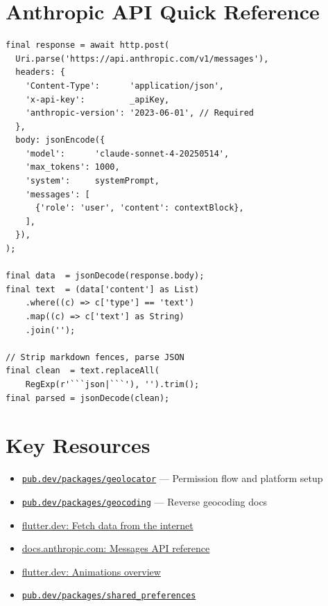 \documentclass[12pt, a4paper]{report}
\begin{document}
\section{Anthropic API Quick Reference}

\begin{tcolorbox}[cyanbox, title=Minimal Dart API Call]
\begin{lstlisting}[style=dartcode]
final response = await http.post(
  Uri.parse('https://api.anthropic.com/v1/messages'),
  headers: {
    'Content-Type':      'application/json',
    'x-api-key':         _apiKey,
    'anthropic-version': '2023-06-01', // Required
  },
  body: jsonEncode({
    'model':      'claude-sonnet-4-20250514',
    'max_tokens': 1000,
    'system':     systemPrompt,
    'messages': [
      {'role': 'user', 'content': contextBlock},
    ],
  }),
);

final data  = jsonDecode(response.body);
final text  = (data['content'] as List)
    .where((c) => c['type'] == 'text')
    .map((c) => c['text'] as String)
    .join('');

// Strip markdown fences, parse JSON
final clean  = text.replaceAll(
    RegExp(r'```json|```'), '').trim();
final parsed = jsonDecode(clean);
\end{lstlisting}
\end{tcolorbox}

\section{Key Resources}

\begin{itemize}[noitemsep]
  \item \href{https://pub.dev/packages/geolocator}{\texttt{pub.dev/packages/geolocator}}
        --- Permission flow and platform setup
  \item \href{https://pub.dev/packages/geocoding}{\texttt{pub.dev/packages/geocoding}}
        --- Reverse geocoding docs
  \item \href{https://docs.flutter.dev/cookbook/networking/fetch-data}
        {flutter.dev: Fetch data from the internet}
  \item \href{https://docs.anthropic.com/en/api/messages}
        {docs.anthropic.com: Messages API reference}
  \item \href{https://docs.flutter.dev/ui/animations}
        {flutter.dev: Animations overview}
  \item \href{https://pub.dev/packages/shared_preferences}
        {\texttt{pub.dev/packages/shared\_preferences}}
\end{itemize}
\end{document}
